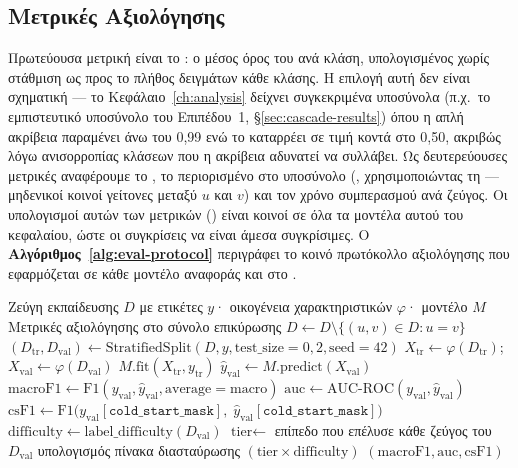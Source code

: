 \subsection{Μετρικές Αξιολόγησης}
\label{subsec:evaluation-metrics}

Πρωτεύουσα μετρική είναι το : ο μέσος όρος του  ανά
κλάση, υπολογισμένος χωρίς στάθμιση ως προς το πλήθος δειγμάτων κάθε κλάσης.
Η
επιλογή αυτή δεν είναι σχηματική --- το Κεφάλαιο~\ref{ch:analysis} δείχνει
συγκεκριμένα υποσύνολα (π.χ.\ το εμπιστευτικό υποσύνολο του Επιπέδου~1,
\S\ref{sec:cascade-results}) όπου η απλή ακρίβεια παραμένει άνω του 0{,}99 ενώ το
 καταρρέει σε τιμή κοντά στο 0{,}50, ακριβώς λόγω ανισορροπίας κλάσεων
που η ακρίβεια αδυνατεί να συλλάβει.
Ως δευτερεύουσες μετρικές αναφέρουμε το
, το  περιορισμένο στο υποσύνολο 
(, χρησιμοποιώντας τη \texttt{} --- μηδενικοί
κοινοί γείτονες μεταξύ $u$ και $v$) και τον χρόνο συμπερασμού ανά ζεύγος.
Οι
υπολογισμοί αυτών των μετρικών (\texttt{}) είναι κοινοί σε
όλα τα μοντέλα αυτού του κεφαλαίου, ώστε οι συγκρίσεις να είναι άμεσα συγκρίσιμες.
Ο \textbf{Αλγόριθμος~\ref{alg:eval-protocol}} περιγράφει το κοινό πρωτόκολλο
αξιολόγησης που εφαρμόζεται σε κάθε μοντέλο αναφοράς και στο .

\begin{algorithm}[h!]
\caption{Πρωτόκολλο Αξιολόγησης Μοντέλου}
\label{alg:eval-protocol}
\begin{algorithmic}[1]
\Require Ζεύγη εκπαίδευσης $D$ με ετικέτες $y$· οικογένεια χαρακτηριστικών $\varphi$·
    μοντέλο $M$
\Ensure Μετρικές αξιολόγησης στο σύνολο επικύρωσης
\State $D \gets D \setminus \{(u,v) \in D : u = v\}$ 
\State $(D_{\text{tr}}, D_{\text{val}}) \gets \text{StratifiedSplit}(D, y,
    \text{test\_size}=0{,}2, \text{seed}=42)$
\State $X_{\text{tr}} \gets \varphi(D_{\text{tr}})$;\quad
    $X_{\text{val}} \gets \varphi(D_{\text{val}})$
\State $M.\text{fit}(X_{\text{tr}}, y_{\text{tr}})$
\State $\hat{y}_{\text{val}} \gets M.\text{predict}(X_{\text{val}})$
\State $\text{macroF1} \gets \text{F1}(y_{\text{val}}, \hat{y}_{\text{val}}, \text{average}=\text{macro})$
\State $\text{auc} \gets \text{AUC-ROC}(y_{\text{val}}, \hat{y}_{\text{val}})$
\State $\text{csF1} \gets \text{F1}\big(y_{\text{val}}[\texttt{cold\_start\_mask}],\;
    \hat{y}_{\text{val}}[\texttt{cold\_start\_mask}]\big)$
    \State $\text{difficulty} \gets \text{label\_difficulty}(D_{\text{val}})$
    \Comment{\S\ref{sec:forensics-protocol}}
    \State $\text{tier} \gets$ επίπεδο που επέλυσε κάθε ζεύγος του $D_{\text{val}}$
    \State υπολογισμός πίνακα διασταύρωσης $(\text{tier} \times \text{difficulty})$
\EndIf
\State \Return $(\text{macroF1}, \text{auc}, \text{csF1})$
\end{algorithmic}
\end{algorithm}

